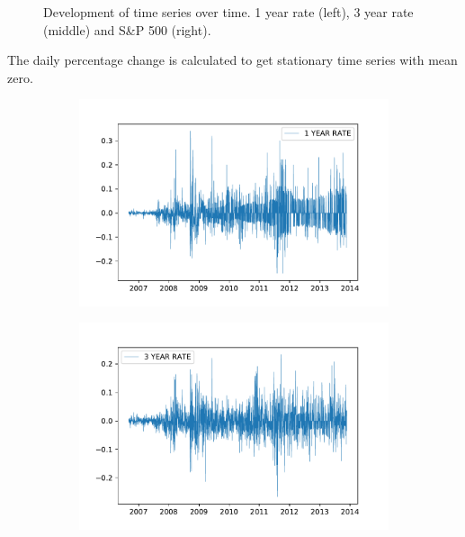 \begin{figure}[H]
\begin{subfigure}[b]{0.32\textwidth}
    \end{subfigure}
    \caption{Development of time series over time. 1 year rate (left), 3 year rate (middle) and S\&P 500 (right).}
    \label{fig:orig_ts}
\end{figure}

The daily percentage change is calculated to get stationary time series with mean zero. 

\begin{figure}[H]
    \centering
    \begin{subfigure}[b]{0.32\textwidth}
    \includegraphics[width=\textwidth]{Figures/1yr_pct.pdf}
    \end{subfigure}
    \begin{subfigure}[b]{0.32\textwidth}
    \includegraphics[width=\textwidth]{Figures/3yr_pct.pdf}
    \end{subfigure}
    \begin{subfigure}[b]{0.32\textwidth}

\end{subfigure}
\end{figure}
